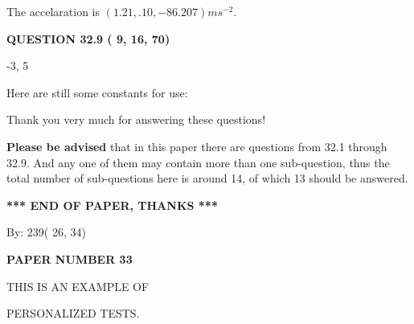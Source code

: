 \documentclass[12pt]{article}
\begin{document}
 
  The accelaration is $  %
(
1.21,
.10,
-86.207)
ms^{-2} $.
 
 
 
 
  
\vspace{0.2in}
  
{\textbf{\Large{QUESTION
32.9 
 (          9,         16,         70)
}}}
  
  


 
 
\noindent{}

-3,  %
5
 
 
 
   
   
 \vspace{0.2in}
Here are still some constants for use:
 
 
 
 
Thank you very much for answering these questions!
 
{\textbf{\large{Please be advised}}} that in this paper there are questions from
32.1 through
32.9.
And any one of them may contain more than one sub-question, thus the total number
of sub-questions here is around 14, of which
13 should be answered.
 
   
   
   
   
\vspace{1.0in} 
{\textbf{\large{ *** END OF PAPER, THANKS *** }}} 
   
   
\hspace{1.0in} By: 
         239(         26,          34)
   
   
   
   
\newpage 
\setcounter{page}{ 
    33001 } 
   
   
   
   
 {\textbf{ \Large{ PAPER NUMBER          33 }}}
   
   
\vspace{0.2in}
   
   
   
   
   
   
 \vspace{0.2in}
 
 
{\Huge  THIS IS AN EXAMPLE OF}
 
{\Huge  PERSONALIZED TESTS. }
 
\end{document}
